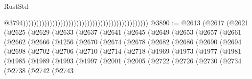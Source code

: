 \begin{lexlean}{RustStd}
\begin{coremodule}
{\begin{coremodule}
{{{{{{{{{{{{{{{{{{{{{{{{{{{{{{{{{{{{{{{{{{{{{{{{{{{{{{{{{{{{{{{{{{{{{{{{{{{{{{{{                                                                                                  @3794)))))))))))))))))))))))))))))))))))))))))))))))
@3890 := @2613
    (@2617
      (@2621
        (@2625
          (@2629
            (@2633
              (@2637
                (@2641
                  (@2645
                    (@2649
                      (@2653
                        (@2657
                          (@2661
                            (@2662
                              (@2666
                                (@1256
                                  (@2670
                                    (@2674
                                      (@2678
                                        (@2682
                                          (@2686
                                            (@2690
                                              (@2694
                                                (@2698
                                                  (@2702
                                                    (@2706
                                                      (@2710
                                                        (@2714
                                                          (@2718
                                                            (@1969
                                                              (@1973
                                                                (@1977
                                                                  (@1981
                                                                    (@1985
                                                                      (@1989
                                                                        (@1993
                                                                          (@1997
                                                                            (@2001
                                                                              (@2005
                                                                                (@2722
                                                                                  (@2726
                                                                                    (@2730
                                                                                      (@2734
                                                                                        (@2738
                                                                                          (@2742
                                                                                            (@2743
}}}}}}}}}}}}}}}}}}}}}}}}}}}}}}}}}}}}}}}}}}}}}}}}}}}}}}}}}}}}}}}}}}}}}}}}}}}}}}}}
\end{coremodule}}
\end{coremodule}
\end{lexlean}
